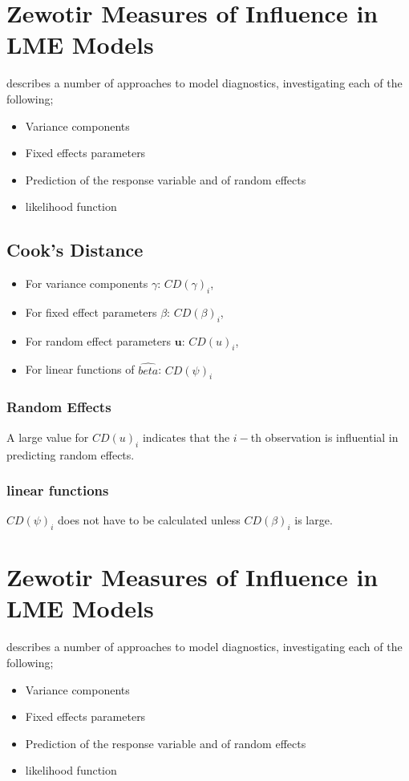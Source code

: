 \documentclass[12pt, a4paper]{article}
\begin{document}
	\section{Zewotir Measures of Influence in LME Models}
	\citet{Zewotir} describes a number of approaches to model diagnostics, investigating each of the following;
	\begin{itemize}
		\item Variance components
		\item Fixed effects parameters
		\item Prediction of the response variable and of random effects
		\item likelihood function
	\end{itemize}
	
	\subsection{Cook's Distance}
	\begin{itemize}
		\item For variance components $\gamma$: $CD(\gamma)_i$,
		\item For fixed effect parameters $\beta$: $CD(\beta)_i$,
		\item For random effect parameters $\boldsymbol{u}$: $CD(u)_i$,
		\item For linear functions of $\hat{beta}$: $CD(\psi)_i$
	\end{itemize}
	
	\newpage
	\subsubsection{Random Effects}
	
	A large value for $CD(u)_i$ indicates that the $i-$th observation is influential in predicting random effects.
	
	\subsubsection{linear functions}
	
	$CD(\psi)_i$ does not have to be calculated unless $CD(\beta)_i$ is large.
	
	

\section{Zewotir Measures of Influence in LME Models}%
\citet{Zewotir} describes a number of approaches to model diagnostics, investigating each of the following;
\begin{itemize}
	\item Variance components
	\item Fixed effects parameters
	\item Prediction of the response variable and of random effects
	\item likelihood function
\end{itemize}
\end{document}
